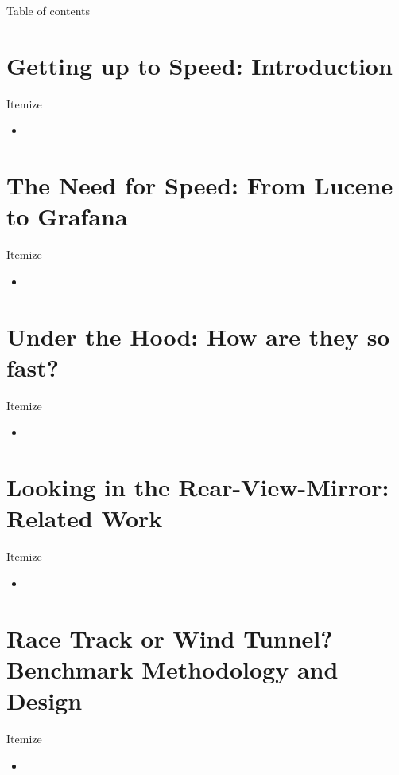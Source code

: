 \documentclass[compress,aspectratio=169]{beamer}
\begin{document}
\begin{frame}[plain]
	\titlepage
\end{frame}

\begin{frame}[t]{Table of contents}
  \tableofcontents[subsectionstyle=hide/hide]
\end{frame}


\section[Introduction]{Getting up to Speed: Introduction}
\begin{frame}{Itemize}
  \begin{itemize}
    \item
  \end{itemize}
\end{frame}
\section[Overview]{The Need for Speed: From Lucene to Grafana}
\begin{frame}{Itemize}
  \begin{itemize}
    \item
  \end{itemize}
\end{frame}
\section[Performance]{Under the Hood: How are they so fast?}
\begin{frame}{Itemize}
  \begin{itemize}
    \item
  \end{itemize}
\end{frame}
\section[Related Work]{Looking in the Rear-View-Mirror: Related Work}
\begin{frame}{Itemize}
  \begin{itemize}
    \item
  \end{itemize}
\end{frame}
\section[Methodology]{Race Track or Wind Tunnel? Benchmark Methodology and Design}
\begin{frame}{Itemize}
  \begin{itemize}
    \item
  \end{itemize}
\end{frame}
\end{document}
